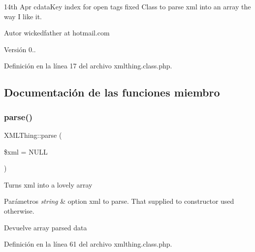 14th Apr cdata\+Key index for open tags fixed Class to parse xml into an array the way I like it.

\begin{DoxyAuthor}{Autor}
wickedfather at hotmail.\+com 
\end{DoxyAuthor}
\begin{DoxyVersion}{Versión}
0.. 
\end{DoxyVersion}


Definición en la línea 17 del archivo xmlthing.\+class.\+php.



\subsection{Documentación de las funciones miembro}
\mbox{\label{classXMLThing_a8d408058141c8a030b433b2deb822baf}} 
\subsubsection{\texorpdfstring{parse()}{parse()}}
{\footnotesize\ttfamily X\+M\+L\+Thing\+::parse (\begin{DoxyParamCaption}\item[{}]{\$xml = {\ttfamily NULL} }\end{DoxyParamCaption})}

Turns xml into a lovely array 
\begin{DoxyParams}{Parámetros}
{\em string} & option xml to parse. That supplied to constructor used otherwise. \\
\hline
\end{DoxyParams}
\begin{DoxyReturn}{Devuelve}
array parsed data 
\end{DoxyReturn}


Definición en la línea 61 del archivo xmlthing.\+class.\+php.


